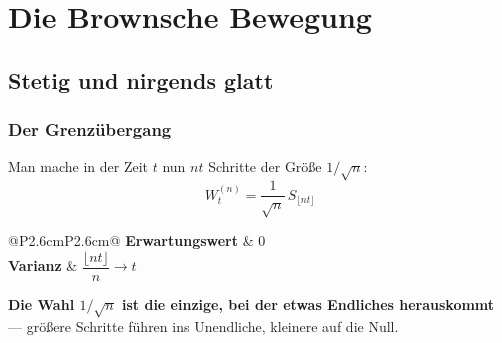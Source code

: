 \part{Die Brownsche Bewegung}

\chapter{Stetig und nirgends glatt}

\section{Der Grenzübergang}

\begin{merksatz}
Man mache in der Zeit $t$ nun $n t$ Schritte der Größe $1/\sqrt n$:
\[ W^{(n)}_t = \frac{1}{\sqrt n}\,S_{\lfloor nt\rfloor} \]

\begin{center}
{\small
\renewcommand{\arraystretch}{1.5}
\begin{tabular}{@{}P{2.6cm}P{2.6cm}@{}}
\toprule
\textbf{Erwartungswert} & $0$\\
\textbf{Varianz} & $\dfrac{\lfloor nt\rfloor}{n} \to t$\\
\bottomrule
\end{tabular}}
\end{center}

\begin{center}
\begin{minipage}{0.9\textwidth}
\textbf{Die Wahl $1/\sqrt n$ ist die einzige, bei der etwas Endliches herauskommt} --- größere Schritte führen ins Unendliche, kleinere auf die Null.
\end{minipage}
\end{center}

\begin{center}
\begin{minipage}{0.88\textwidth}
\end{minipage}
\end{center}
\end{merksatz}


